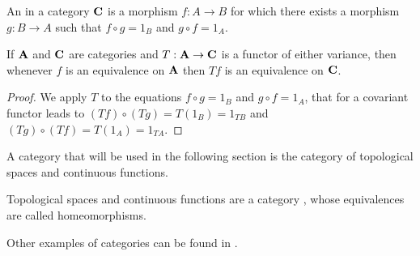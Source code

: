 \documentclass[../1.tex]{subfiles}
\begin{document}
    \begin{defn}
        An  in a category $\textbf{C}$ is a morphism $f : A \to B$ for which there exists a morphism $g : B \to A$ such that
        $ f \circ g = 1_B$ and $ g \circ f = 1_A$.
    \end{defn}

    \begin{thm}
        If $\textbf{A}$ and $\textbf{C}$ are categories and $T : \textbf{A} \to \textbf{C}$ is a functor of either variance, then whenever $f$ is 
        an equivalence on $\textbf{A}$ then $Tf$ is an equivalence on $\textbf{C}$.
    \end{thm}
    \begin{proof}
        We apply $T$ to the equations $ f \circ g = 1_B$ and $ g \circ f = 1_A$, that for a covariant functor leads to 
        $(Tf) \circ (Tg) = T(1_B) = 1_{TB}$ and $(Tg) \circ (Tf) = T(1_A) = 1_{TA}$.
    \end{proof}

    A category that will be used in the following section is the category of topological spaces and continuous functions.

    \begin{thm}
        Topological spaces and continuous functions are a category , whose equivalences are called homeomorphisms.
    \end{thm}

    Other examples of categories can be found in \cite{rotman}.
\end{document}
